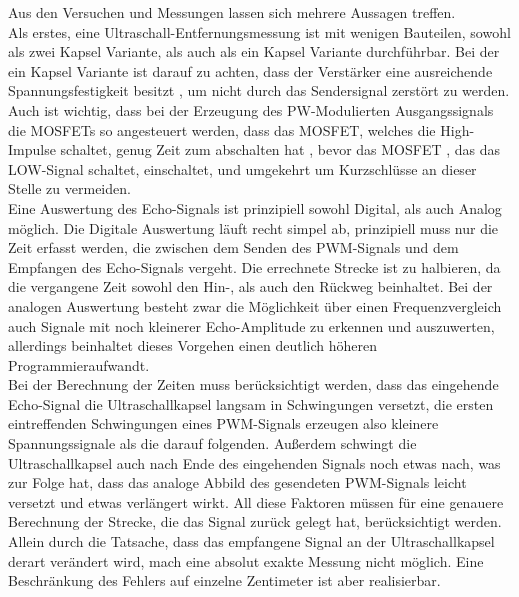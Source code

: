 Aus den Versuchen und Messungen lassen sich mehrere Aussagen treffen. \\
Als erstes, eine Ultraschall-Entfernungsmessung ist mit wenigen Bauteilen, sowohl als zwei Kapsel Variante, als auch als ein Kapsel Variante durchführbar. Bei der ein Kapsel Variante ist darauf zu achten, dass der Verstärker eine ausreichende Spannungsfestigkeit besitzt , um nicht durch das Sendersignal zerstört zu werden. Auch ist wichtig, dass bei der Erzeugung des PW-Modulierten Ausgangssignals die MOSFETs so angesteuert werden, dass das MOSFET, welches die High-Impulse schaltet, genug Zeit zum abschalten hat , bevor das MOSFET , das das LOW-Signal schaltet, einschaltet, und umgekehrt um Kurzschlüsse an dieser Stelle zu vermeiden.\\
Eine Auswertung des Echo-Signals ist prinzipiell sowohl Digital, als auch Analog möglich. Die Digitale Auswertung läuft recht simpel ab, prinzipiell muss nur die Zeit erfasst werden, die zwischen dem Senden des PWM-Signals und dem Empfangen des Echo-Signals vergeht. Die errechnete Strecke ist zu halbieren, da die vergangene Zeit sowohl den Hin-, als auch den Rückweg beinhaltet. Bei der analogen Auswertung besteht zwar die Möglichkeit über einen Frequenzvergleich auch Signale mit noch kleinerer Echo-Amplitude zu erkennen und auszuwerten, allerdings beinhaltet dieses Vorgehen einen deutlich höheren Programmieraufwandt.\\
Bei der Berechnung der Zeiten muss berücksichtigt werden, dass das eingehende Echo-Signal die Ultraschallkapsel langsam in Schwingungen versetzt, die ersten eintreffenden Schwingungen eines PWM-Signals erzeugen also kleinere Spannungssignale als die darauf folgenden. Außerdem schwingt die Ultraschallkapsel auch nach Ende des eingehenden Signals noch etwas nach, was zur Folge hat, dass das analoge Abbild des gesendeten PWM-Signals leicht versetzt und etwas verlängert wirkt. All diese Faktoren müssen für eine genauere Berechnung der Strecke, die das Signal zurück gelegt hat, berücksichtigt werden. Allein durch die Tatsache, dass das empfangene Signal an der Ultraschallkapsel derart verändert wird, mach eine absolut exakte Messung nicht möglich. Eine Beschränkung des Fehlers auf einzelne Zentimeter ist aber realisierbar.\\
